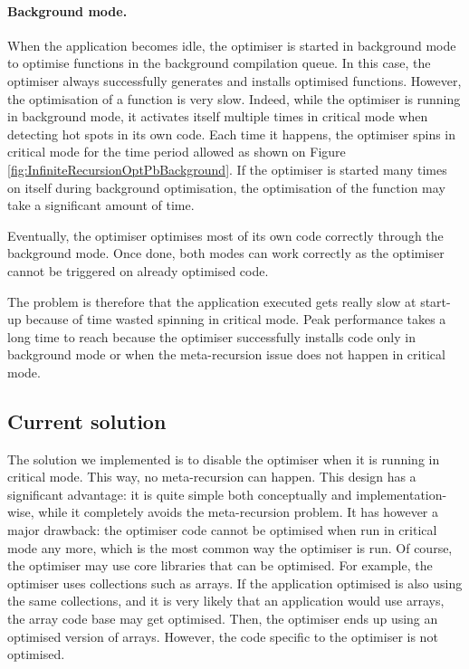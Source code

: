 \documentclass[a4paper,12pt,twoside]{../includes/ThesisStyle}
\begin{document}

\paragraph{Background mode.} When the application becomes idle, the optimiser is started in background mode to optimise functions in the background compilation queue. In this case, the optimiser always successfully generates and installs optimised functions. However, the optimisation of a function is very slow. Indeed, while the optimiser is running in background mode, it activates itself multiple times in critical mode when detecting hot spots in its own code. Each time it happens, the optimiser spins in critical mode for the time period allowed as shown on Figure \ref{fig:InfiniteRecursionOptPbBackground}. If the optimiser is started many times on itself during background optimisation, the optimisation of the function may take a significant amount of time. 

Eventually, the optimiser optimises most of its own code correctly through the background mode. Once done, both modes can work correctly as the optimiser cannot be triggered on already optimised code.

The problem is therefore that the application executed gets really slow at start-up because of time wasted spinning in critical mode. Peak performance takes a long time to reach because the optimiser successfully installs code only in background mode or when the meta-recursion issue does not happen in critical mode. 

\subsection{Current solution}

The solution we implemented is to disable the optimiser when it is running in critical mode. This way, no meta-recursion can happen. This design has a significant advantage: it is quite simple both conceptually and implementation-wise, while it completely avoids the meta-recursion problem. It has however a major drawback: the optimiser code cannot be optimised when run in critical mode any more, which is the most common way the optimiser is run. Of course, the optimiser may use core libraries that can be optimised. For example, the optimiser uses collections such as arrays. If the application optimised is also using the same collections, and it is very likely that an application would use arrays, the array code base may get optimised. Then, the optimiser ends up using an optimised version of arrays. However, the code specific to the optimiser is not optimised.
\end{document}
